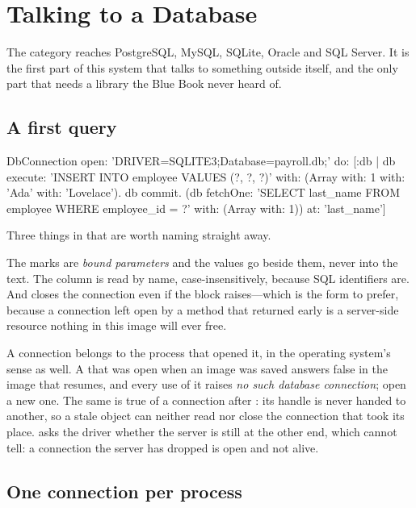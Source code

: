 \chapter{Talking to a Database}
\label{ch:database}


The  category reaches PostgreSQL, MySQL, SQLite, Oracle and SQL
Server. It is the first part of this system that talks to something outside
itself, and the only part that needs a library the Blue Book never heard of.

\section{A first query}

\begin{st}
DbConnection open: 'DRIVER=SQLITE3;Database=payroll.db;' do: [:db |
    db execute: 'INSERT INTO employee VALUES (?, ?, ?)'
       with: (Array with: 1 with: 'Ada' with: 'Lovelace').
    db commit.
    (db fetchOne: 'SELECT last_name FROM employee WHERE employee_id = ?'
        with: (Array with: 1)) at: 'last_name']
\end{st}

Three things in that are worth naming straight away.

The  marks are \emph{bound parameters} and the values go beside them,
never into the text. The column is read by name, case-insensitively, because
SQL identifiers are. And  closes the connection even if the block
raises---which is the form to prefer, because a connection left open by a
method that returned early is a server-side resource nothing in this image
will ever free.

A connection belongs to the process that opened it, in the operating
system's sense as well. A  that was open when an image was
saved answers  false in the image that resumes, and every use of
it raises \emph{no such database connection}; open a new one. The same is
true of a connection after : its handle is never handed to another,
so a stale object can neither read nor close the connection that took its
place.  asks the driver whether the server is still at the other
end, which  cannot tell: a connection the server has dropped is
open and not alive.

\section{One connection per process}

